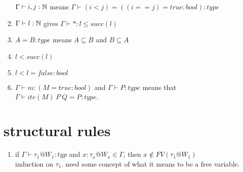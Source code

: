 \message{ !name(paper.tex)}\documentclass{article}
\begin{document}
\begin{enumerate}
       $\Gamma \vdash i, j : \mathbb{N}$ means $\Gamma \vdash (i < j) = ((i == j) = true : bool) : type$
      \item $\Gamma \vdash l : \mathbb{N}$ gives $\Gamma \vdash * : l \leq succ(l)$
      \item $A = B : type$ means $A \subseteq B$ and $B \subseteq A$
      \item $l < succ(l)$
      \item $l < l = false: bool$
      \item $\Gamma \vdash m: (M = true : bool)$
    and $\Gamma \vdash P : type$ means that
        $\Gamma \vdash ite (M) \: P\: Q = P : type$.
\end{enumerate}

\section*{structural rules}
\begin{enumerate}
    \item if $\Gamma \vdash \tau_1 @ W_1 :typ$ and $x: \tau_x @ W_x \in \Gamma$, then $x \notin FV(\tau_1 @ W_1)$\\
    induction on $\tau_1$. need some concept of what it means to be a free variable. 
\end{enumerate}
\end{document}
